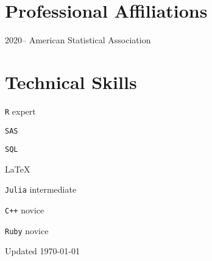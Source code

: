 \documentclass[12pt,letterpaper]{report}
\newcommand{\listitemspace}{0.15em}
\renewenvironment{itemize}
{\begin{list}{}{\setlength{\leftmargin}{0em}
            \setlength{\parskip}{0em}
            \setlength{\itemsep}{\listitemspace}
            \setlength{\parsep}{\listitemspace}}}
    {\end{list}}
\begin{document}
    \section*{Professional Affiliations}

    \begin{tablist}

        \item[2020--] \tab American Statistical Association

    \end{tablist}

    \section*{Technical Skills}

    \begin{itemize}

        \item \texttt{R} \tab expert
        
        \item \texttt{SAS}
        
        \item \texttt{SQL}
        
        \item \LaTeX
        
        \item \texttt{Julia} \tab intermediate
        
        \item \texttt{C++} \tab novice
        
        \item \texttt{Ruby} \tab novice

    \end{itemize}

    \begin{center}
        \vfill
        Updated \monthyeardate\today
    \end{center}
\end{document}
